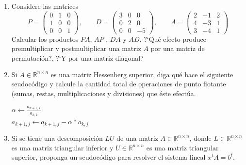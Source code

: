 \documentclass[12pt,letterpaper]{article}
\theoremstyle{plain}
\begin{document}
\begin{enumerate}
\item Considere las matrices
$$
P=\left(\begin{array}{ccc}
      0 & 1 & 0  \\
      1 & 0 & 0  \\
      0 & 0 & 1 
      \end{array}\right), \qquad D=\left(\begin{array}{ccc}
      3 & 0 & 0  \\
      0 & 2 & 0  \\
      0 & 0 & -5 
      \end{array}\right), \qquad A=\left(\begin{array}{ccc}
      2 & -1 & 2  \\
      4 & -3 & 1  \\
      3 & -4 & 1 
      \end{array}\right)
$$
Calcular los productos $PA$, $AP$ , $DA$ y $AD$. ?`Qu\'e efecto produce premultiplicar y postmultiplicar una matriz $A$ por una matriz de permutación?, ?`Y por una matriz diagonal?

\item Si $A \in \mathbb{R}^{n\times n}$ es una matriz Hessenberg superior, diga qu\'e hace el siguiente seudoc\'odigo y calcule la cantidad total de operaciones de punto flotante (sumas, restas, multiplicaciones y divisiones) que \'este efect\'ua.

\begin{algorithm}[H]
 \BlankLine
 {
      $\alpha \leftarrow \displaystyle\frac{a_{k+1,k}}{a_{k,k}}$\\
      {
	$a_{k+1,j} \leftarrow a_{k+1,j}-\alpha*a_{k,j}$\\
      }	
 }
\end{algorithm}

\item Si se tiene una descomposici\'on $LU$ de una matriz $A \in \mathbb{R}^{n\times n}$, donde $L \in \mathbb{R}^{n\times n}$ es una matriz triangular inferior y $U \in \mathbb{R}^{n\times n}$ es una matriz triangular superior, proponga un seudoc\'odigo para resolver el sistema lineal $x^tA = b^t$.


\end{enumerate}
\end{document}
